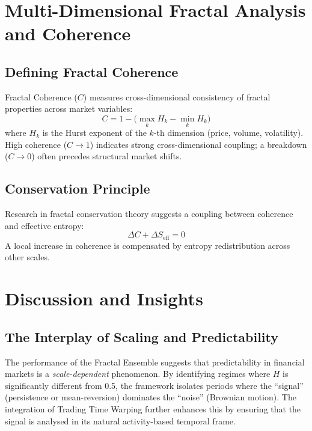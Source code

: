 \documentclass[12pt,a4paper]{article}
\begin{document}
\section{Multi-Dimensional Fractal Analysis and Coherence}
\label{sec:coherence}

\subsection{Defining Fractal Coherence}

Fractal Coherence ($C$) measures cross-dimensional consistency of fractal
properties across market variables:
\begin{equation}
  C = 1 - \bigl(\max_k H_k - \min_k H_k\bigr)
  \label{eq:coherence}
\end{equation}
where $H_k$ is the Hurst exponent of the $k$-th dimension (price, volume,
volatility).  High coherence ($C \to 1$) indicates strong cross-dimensional
coupling; a breakdown ($C \to 0$) often precedes structural market shifts.

\subsection{Conservation Principle}

Research in fractal conservation theory suggests a coupling between coherence
and effective entropy:
\begin{equation}
  \Delta C + \Delta S_{\mathrm{eff}} = 0
  \label{eq:conservation}
\end{equation}
A local increase in coherence is compensated by entropy redistribution
across other scales.

\section{Discussion and Insights}
\label{sec:discussion}

\subsection{The Interplay of Scaling and Predictability}

The performance of the Fractal Ensemble suggests that predictability in
financial markets is a \emph{scale-dependent} phenomenon.  By identifying
regimes where $H$ is significantly different from 0.5, the framework
isolates periods where the ``signal'' (persistence or mean-reversion)
dominates the ``noise'' (Brownian motion).  The integration of Trading Time
Warping further enhances this by ensuring that the signal is analysed in
its natural activity-based temporal frame.
\end{document}

